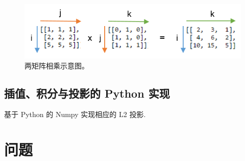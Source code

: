 \documentclass{article}
\begin{document}
\begin{figure}[ht!]
    \centering
    \includegraphics[scale=2]{./figures/twomat.png}
    \caption{两矩阵相乘示意图。}
    \label{fig:twomat}
\end{figure}

\subsection{插值、积分与投影的 Python 实现}
基于 Python 的 Numpy 实现相应的 L2 投影.

\section{问题}

\cite{fem_2010}


\end{document}
